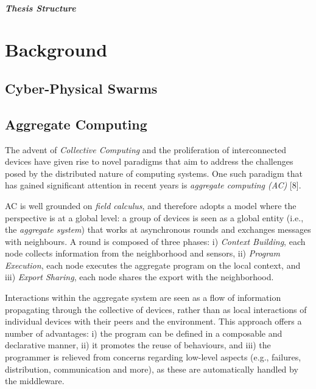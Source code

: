 \documentclass[12pt,a4paper,openright,twoside]{book}
\begin{document}
%
\paragraph{Thesis Structure} 


\chapter{Background}
\label{chap:background}

\section{Cyber-Physical Swarms}
%
\section{Aggregate Computing}

The advent of \emph{Collective Computing} and the proliferation of interconnected devices have given rise to novel 
    paradigms that aim to address the challenges posed by the distributed nature of computing
    systems. One such paradigm that has gained significant attention in recent years is 
    \emph{aggregate computing (AC)} [8].

AC is well grounded on \emph{field calculus}, and therefore adopts a model where the perspective is at a global level: 
    a group of devices is seen as a global entity (i.e., the \emph{aggregate system}) that works at asynchronous 
    rounds and exchanges messages with neighbours. 
    A round is composed of three phases:
    i) \emph{Context Building}, each node collects information from the 
        neighborhood and sensors,
    ii) \emph{Program Execution}, each node executes the aggregate program on the local context, and
    iii) \emph{Export Sharing}, each node shares the export with the neighborhood.

Interactions within the aggregate system are seen as a flow of information propagating through the 
    collective of devices, rather than as local interactions of individual devices with their
    peers and the environment. This approach offers a number of advantages:
    i) the program can be defined in a composable and declarative manner, 
    ii) it promotes the reuse of behaviours, and 
    iii) the programmer is relieved from concerns regarding low-level aspects (e.g., failures, distribution, communication and more), 
    as these are automatically handled by the middleware.
\end{document}
